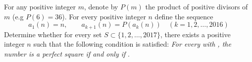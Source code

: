 For any positive integer $m$, denote by $P(m)$ the product of positive divisors of $m$ (e.g $P(6)=36$). For every positive integer $n$ define the sequence
$$a_1(n)=n,\qquad a_{k+1}(n)=P(a_k(n))\quad (k=1,2,\dots,2016)$$Determine whether for every set $S\subset\{1,2,\dots,2017\}$, there exists a positive integer $n$ such that the following condition is satisfied:
\textit{For every  with , the number  is a perfect square if and only if }.